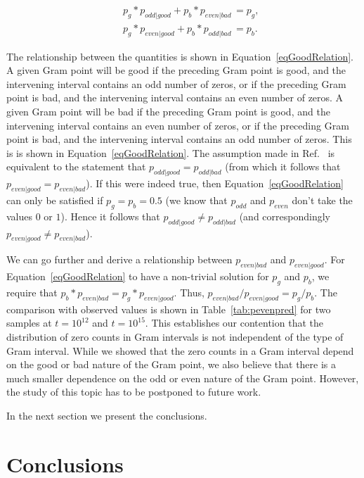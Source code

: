 \documentclass[twoside]{article}
\begin{document}
\begin{eqnarray}
&&p_g*p_{odd|good}  + p_b*p_{even|bad}\, =  p_g,\nonumber\\
&&p_g*p_{even|good} + p_b*p_{odd|bad}\, = p_b.
\label{eqGoodRelation}
\end{eqnarray}

The relationship between the quantities is shown in Equation~\ref{eqGoodRelation}. A given Gram point will be good if the preceding Gram point is good, and the intervening interval contains an odd number of zeros, or if the preceding Gram point is bad, and the intervening interval contains an even number of zeros. A given Gram point will be bad if the preceding Gram point is good, and the intervening interval contains an even number of zeros, or if the preceding Gram point is bad, and the intervening interval contains an odd number of zeros. This is is shown in Equation~\ref{eqGoodRelation}. The assumption made in Ref.~\cite{Odlyzko(1992)} is equivalent to the statement that $p_{odd|good} = p_{odd|bad}$ (from which it follows that  $p_{even|good} = p_{even|bad}$). If this were indeed true, then Equation~\ref{eqGoodRelation} can only be satisfied if $p_g = p_b = 0.5$ (we know that $p_{odd}$ and $p_{even}$ don't take the values $0$ or $1$). Hence it follows that $p_{odd|good} \neq p_{odd|bad}$ (and correspondingly $p_{even|good} \neq p_{even|bad}$). 

We can go further and derive a relationship between $p_{even|bad}$ and $p_{even|good}$. For Equation~\ref{eqGoodRelation} to have a non-trivial solution for $p_g$ and $p_b$, we require that $p_b*p_{even|bad} = p_g*p_{even|good}$. Thus, $p_{even|bad}/p_{even|good}= p_g/p_b$. The comparison with observed values is shown in Table~\ref{tab:pevenpred} for two samples at $t=10^{12}$ and $t=10^{15}$. This establishes our contention that the distribution of zero counts in Gram intervals is not independent of the type of Gram interval. While we showed that the zero counts in a Gram interval depend on the good or bad nature of the Gram point, we also believe that there is a much smaller dependence  on the odd or even nature of the Gram point. However, the study of this topic has to be postponed to future work.

In the next section we present the conclusions.

\section{\label{conclusions}Conclusions}
\end{document}
